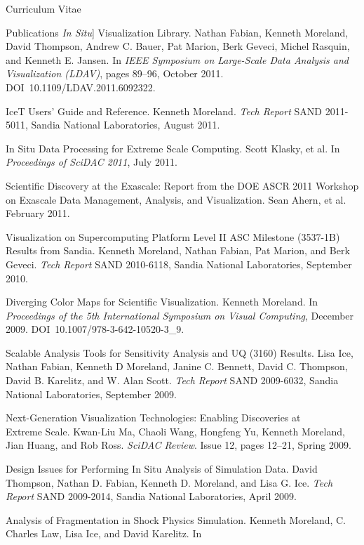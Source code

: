 \documentclass{article}
\begin{document}
\begin{cv}{Curriculum Vitae}
\begin{cvlist}{Publications}
      \emph{In Situ}] Visualization Library. Nathan Fabian, Kenneth
      Moreland, David Thompson, Andrew C. Bauer, Pat Marion, Berk Geveci,
      Michel Rasquin, and Kenneth E. Jansen. In \emph{IEEE Symposium on
        Large-Scale Data Analysis and Visualization (LDAV)}, pages 89--96,
      October 2011. DOI~10.1109/LDAV.2011.6092322.
    \item[IceT Users' Guide and Reference.] Kenneth Moreland. \emph{Tech
      Report} SAND 2011-5011, Sandia National Laboratories, August 2011.
    \item[In Situ Data Processing for Extreme Scale Computing.] Scott
      Klasky, et al. In \emph{Proceedings of SciDAC 2011}, July 2011.
    \item[Scientific Discovery at the Exascale: Report from the DOE ASCR
      2011] Workshop on Exascale Data Management, Analysis, and
      Visualization. Sean Ahern, et al. February 2011.
    \item[Visualization on Supercomputing Platform Level II ASC Milestone]
      (3537-1B) Results from Sandia. Kenneth Moreland, Nathan Fabian, Pat
      Marion, and Berk Geveci. \emph{Tech Report} SAND 2010-6118, Sandia
      National Laboratories, September 2010.
    \item[Diverging Color Maps for Scientific Visualization.] Kenneth
      Moreland. In \emph{Proceedings of the 5th International Symposium on
        Visual Computing}, December 2009. DOI~10.1007/978-3-642-10520-3\_9.
    \item[Scalable Analysis Tools for Sensitivity Analysis and UQ (3160)
      Results.] Lisa Ice, Nathan Fabian, Kenneth D Moreland, Janine
      C. Bennett, David C. Thompson, David B. Karelitz, and W. Alan
      Scott. \emph{Tech Report} SAND 2009-6032, Sandia National
      Laboratories, September 2009.
    \item[Next-Generation Visualization Technologies: Enabling Discoveries
      at]~\\ Extreme Scale. Kwan-Liu Ma, Chaoli Wang, Hongfeng Yu, Kenneth
      Moreland, Jian Huang, and Rob Ross. \emph{SciDAC Review}. Issue 12,
      pages 12--21, Spring 2009.
    \item[Design Issues for Performing In Situ Analysis of Simulation
      Data.] David Thompson, Nathan D. Fabian, Kenneth D. Moreland, and
      Lisa G. Ice. \emph{Tech Report} SAND 2009-2014, Sandia National
      Laboratories, April 2009.
    \item[Analysis of Fragmentation in Shock Physics Simulation.] Kenneth
      Moreland, C. Charles Law, Lisa Ice, and David Karelitz. In

\end{cvlist}
\end{cv}
\end{document}
